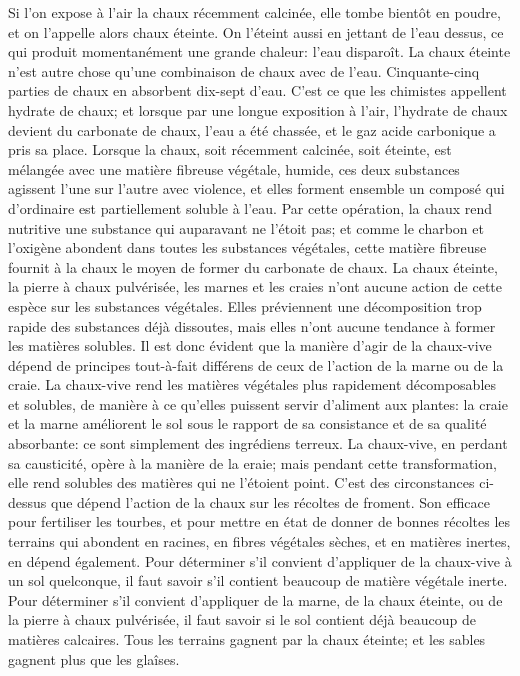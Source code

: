 Si l'on expose à l'air la chaux récemment calcinée, elle tombe bientôt en poudre, et on l'appelle alors chaux éteinte. On l'éteint aussi en jettant de l'eau dessus, ce qui produit momentanément une grande chaleur: l'eau disparoît.
La chaux éteinte n'est autre chose qu'une combinaison de chaux avec de l'eau. Cinquante-cinq parties de chaux en absorbent dix-sept d'eau. C'est ce que les chimistes appellent hydrate de chaux; et lorsque par une longue exposition à l'air, l'hydrate de chaux devient du carbonate de chaux, l'eau a été chassée, et le gaz acide carbonique a pris sa place.
Lorsque la chaux, soit récemment calcinée, soit éteinte, est mélangée avec une matière fibreuse végétale, humide, ces deux substances\setcounter{page}{220} agissent l'une sur l'autre avec violence, et elles forment ensemble un composé qui d'ordinaire est partiellement soluble à l'eau. Par cette opération, la chaux rend nutritive une substance qui auparavant ne l'étoit pas; et comme le charbon et l'oxigène abondent dans toutes les substances végétales, cette matière fibreuse fournit à la chaux le moyen de former du carbonate de chaux. La chaux éteinte, la pierre à chaux pulvérisée, les marnes et les craies n'ont aucune action de cette espèce sur les substances végétales. Elles préviennent une décomposition trop rapide des substances déjà dissoutes, mais elles n'ont aucune tendance à former les matières solubles. Il est donc évident que la manière d'agir de la chaux-vive dépend de principes tout-à-fait différens de ceux de l'action de la marne ou de la craie. La chaux-vive rend les matières végétales plus rapidement décomposables et solubles, de manière à ce qu'elles puissent servir d'aliment aux plantes: la craie et la marne améliorent le sol sous le rapport de sa consistance et de sa qualité absorbante: ce sont simplement des ingrédiens terreux. La chaux-vive, en perdant sa causticité, opère à la manière de la\setcounter{page}{221} eraie; mais pendant cette transformation, elle rend solubles des matières qui ne l'étoient point.
C'est des circonstances ci-dessus que dépend l'action de la chaux sur les récoltes de froment. Son efficace pour fertiliser les tourbes, et pour mettre en état de donner de bonnes récoltes les terrains qui abondent en racines, en fibres végétales sèches, et en matières inertes, en dépend également.
Pour déterminer s'il convient d'appliquer de la chaux-vive à un sol quelconque, il faut savoir s'il contient beaucoup de matière végétale inerte. Pour déterminer s'il convient d'appliquer de la marne, de la chaux éteinte, ou de la pierre à chaux pulvérisée, il faut savoir si le sol contient déjà beaucoup de matières calcaires. Tous les terrains gagnent par la chaux éteinte; et les sables gagnent plus que les glaîses.
